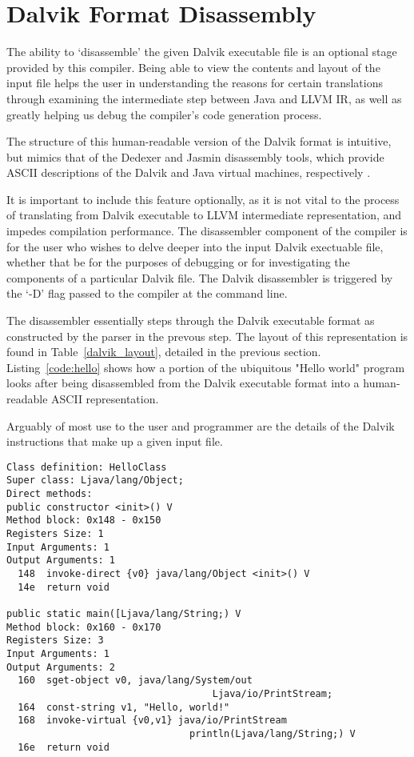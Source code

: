 \section{Dalvik Format Disassembly}

The ability to `disassemble' the given Dalvik executable file is an optional stage provided by this compiler. Being able to view the contents and layout of the input file helps the user in understanding the reasons for certain translations through examining the intermediate step between Java and LLVM IR, as well as greatly helping us debug the compiler's code generation process.

The structure of this human-readable version of the Dalvik format is intuitive, but mimics that of the Dedexer and Jasmin disassembly tools, which provide ASCII descriptions of the Dalvik and Java virtual machines, respectively\cite{dedexer} \cite{jasmin}. 

It is important to include this feature optionally, as it is not vital to the process of translating from Dalvik executable to LLVM intermediate representation, and impedes compilation performance. The disassembler component of the compiler is for the user who wishes to delve deeper into the input Dalvik exectuable file, whether that be for the purposes of debugging or for investigating the components of a particular Dalvik file. The Dalvik disassembler is triggered by the `-D' flag passed to the compiler at the command line.

The disassembler essentially steps through the Dalvik executable format as constructed by the parser in the prevous step. The layout of this representation is found in Table~\ref{dalvik_layout}, detailed in the previous section. Listing~\ref{code:hello} shows how a portion of the ubiquitous "Hello world" program looks after being disassembled from the Dalvik executable format into a human-readable ASCII representation.

Arguably of most use to the user and programmer are the details of the Dalvik instructions that make up a given input file.

\lstset{
	language=Assembler,
	basicstyle=\small,
	stringstyle=\ttfamily
}

\begin{lstlisting}[frame=single, numberstyle=\tiny, caption={Hello World program},label=code:hello]
Class definition: HelloClass
Super class: Ljava/lang/Object;
Direct methods:
public constructor <init>() V
Method block: 0x148 - 0x150
Registers Size: 1
Input Arguments: 1
Output Arguments: 1
  148  invoke-direct {v0} java/lang/Object <init>() V
  14e  return void

public static main([Ljava/lang/String;) V
Method block: 0x160 - 0x170
Registers Size: 3
Input Arguments: 1
Output Arguments: 2
  160  sget-object v0, java/lang/System/out
                                    Ljava/io/PrintStream;
  164  const-string v1, "Hello, world!"
  168  invoke-virtual {v0,v1} java/io/PrintStream
                                println(Ljava/lang/String;) V
  16e  return void     
\end{lstlisting}
